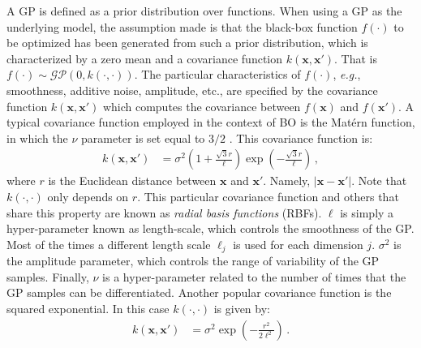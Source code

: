 A GP is defined as a prior distribution over functions. When using a GP as the underlying model, the assumption 
made is that the black-box function $f(\cdot)$ to be optimized has been generated from such a prior distribution, 
which is characterized by a zero mean and a covariance function $k(\mathbf{x},\mathbf{x}')$. 
That is $f(\cdot) \sim \mathcal{GP}(0,k(\cdot,\cdot))$.  The particular characteristics of $f(\cdot)$,
\emph{e.g.}, smoothness, additive noise, amplitude, etc., are specified by the covariance function 
$k(\mathbf{x},\mathbf{x}')$ which computes the covariance between $f(\mathbf{x})$ and $f(\mathbf{x}')$. 
A typical covariance function employed in the context of BO is the Mat\'ern 
function, in which the $\nu$ parameter is set equal to $3/2$ \citep{snoek2013}. This covariance function is:
\begin{align}
k(\mathbf{x},\mathbf{x}') & = \sigma^2 ( 1 + \frac{\sqrt{3}r}{\ell})\exp(-\frac{\sqrt{3}r}{\ell})\,,
\end{align}
where $r$ is the Euclidean distance between $\mathbf{x}$ and $\mathbf{x}'$. Namely, $|\mathbf{x}-\mathbf{x}'|$. 
Note that $k(\cdot,\cdot)$ only depends on $r$. This particular covariance function and others that share
this property are known as \textit{radial basis functions} (RBFs). $\ell$ is simply a hyper-parameter known as length-scale,
which controls the smoothness of the GP. Most of the times a different length scale $\ell_j$  is
used for each dimension $j$. $\sigma^2$ is the amplitude parameter, which controls the range of variability 
of the GP samples. Finally, $\nu$ is a hyper-parameter related to the number of times that the GP 
samples can be differentiated. Another popular covariance function is the squared exponential. 
In this case $k(\cdot,\cdot)$ is given by:
\begin{align}
k(\mathbf{x},\mathbf{x}') & = \sigma^2 \exp\left(-\frac{r^2}{2\ell^2}\right)\,.
\end{align}

